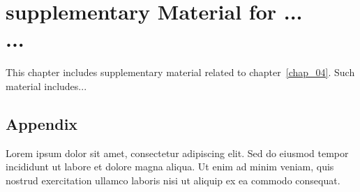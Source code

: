 
\chapter[Supplementary Material for ...]{supplementary Material for ... \\ ...}\label{Apend:chap_04}
\minitoc

\vspace{1cm}

This chapter includes supplementary material related to chapter~\ref{chap_04}. Such material includes...

\section{Appendix}\label{appe:01}
Lorem ipsum dolor sit amet, consectetur adipiscing elit. Sed do eiusmod tempor incididunt ut labore et dolore magna aliqua. Ut enim ad minim veniam, quis nostrud exercitation ullamco laboris nisi ut aliquip ex ea commodo consequat.

